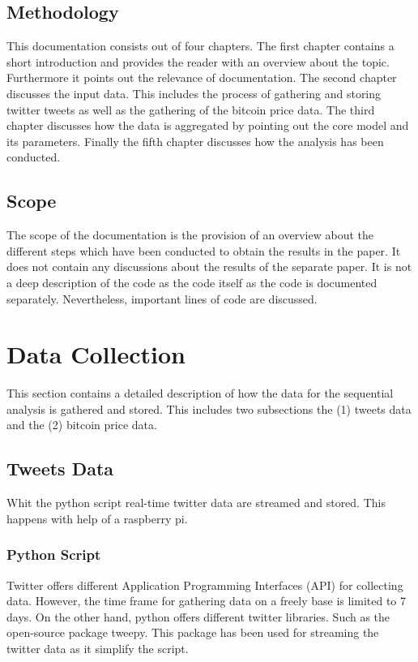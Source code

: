 \documentclass[a4paper,12pt]{article}
\begin{document}
\begin{spacing}{1.2}
\subsection{Methodology}
This documentation consists out of four chapters. The first chapter contains a short introduction and provides the reader with an overview about the topic. Furthermore it points out the relevance of documentation. The second chapter discusses the input data. This includes the process of gathering and storing twitter tweets as well as the gathering of the bitcoin price data. The third chapter discusses how the data is aggregated by pointing out the core model and its parameters. Finally the fifth chapter discusses how the analysis has been conducted.

\subsection{Scope}
The scope of the documentation is the provision of an overview about the different steps which have been conducted to obtain the results in the paper. It does not contain any discussions about the results of the separate paper. It is not a deep description of the code as the code itself as the code is documented separately. Nevertheless, important lines of code are discussed. 
\clearpage 


\section{Data Collection}
This section contains a detailed description of how the data for the sequential analysis is gathered and stored. This includes two  subsections the (1) tweets data and the (2) bitcoin price data.
\subsection{Tweets Data}
Whit the python script real-time twitter data are streamed and stored. This happens with help of a raspberry pi.
\subsubsection{Python Script}
Twitter offers different Application Programming Interfaces (API) for collecting data. However, the time frame for gathering data on a freely base is limited to 7 days. On the other hand, python offers different twitter libraries. Such as the open-source package tweepy. This package has been used for streaming the twitter data as it simplify the script.


\end{spacing}
\end{document}
